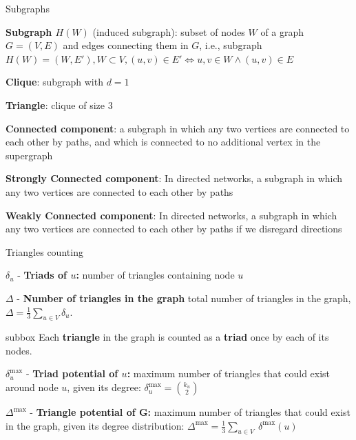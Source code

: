 \documentclass[a4paper,11pt]{book}
\begin{document}
\begin{textbox}{Subgraphs}

\textbf{Subgraph $H(W)$} (induced subgraph): subset of nodes $W$ of a graph $G=(V,E)$ and edges connecting them in $G$, i.e., subgraph $H(W)=(W,E'), W \subset V, (u,v) \in E' \iff u,v \in W \wedge (u,v) \in E$

\textbf{Clique}: subgraph with $d=1$

\textbf{Triangle}: clique of size 3

\textbf{Connected component}: a subgraph in which any two vertices are connected to each other by paths, and which is connected to no additional vertex in the supergraph

\textbf{Strongly Connected component}: In directed networks, a subgraph in which any two vertices are connected to each other by paths

\textbf{Weakly Connected component}: In directed networks, a subgraph in which any two vertices are connected to each other by paths if we disregard directions

\end{textbox}


\begin{textbox}{Triangles counting}

$\delta_u$ - \textbf{Triads of $u$:} number of triangles containing node $u$

$\Delta$ - \textbf{Number of triangles in the graph} total number of triangles in the graph, $\Delta=\frac{1}{3}\sum_{u\in V}\delta_u$. 

\begin{subbox}{subbox}{}
\tiny{Each \textbf{triangle} in the graph is counted as a \textbf{triad} once by each of its nodes. }
\end{subbox}

$\delta^{\max}_u$ - \textbf{Triad potential of $u$:} maximum number of triangles that could exist around node $u$, given its degree: $\delta^{\max}_u=\binom {k_{u}}{2}$

$\Delta^{\max}$ - \textbf{Triangle potential of G:} maximum number of triangles that could exist in the graph, given its degree distribution: $\Delta^{\max}=\frac {1}{3}\sum_{u\in V}\ \delta^{\max} (u)$


\end{textbox}
\end{document}
